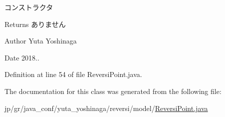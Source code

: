 コンストラクタ 

\begin{DoxyReturn}{Returns}
ありません 
\end{DoxyReturn}
\begin{DoxyAuthor}{Author}
Yuta Yoshinaga 
\end{DoxyAuthor}
\begin{DoxyDate}{Date}
2018.. 
\end{DoxyDate}


Definition at line 54 of file Reversi\+Point.\+java.



The documentation for this class was generated from the following file\+:\begin{DoxyCompactItemize}
\item 
jp/gr/java\+\_\+conf/yuta\+\_\+yoshinaga/reversi/model/\hyperlink{_reversi_point_8java}{Reversi\+Point.\+java}\end{DoxyCompactItemize}
